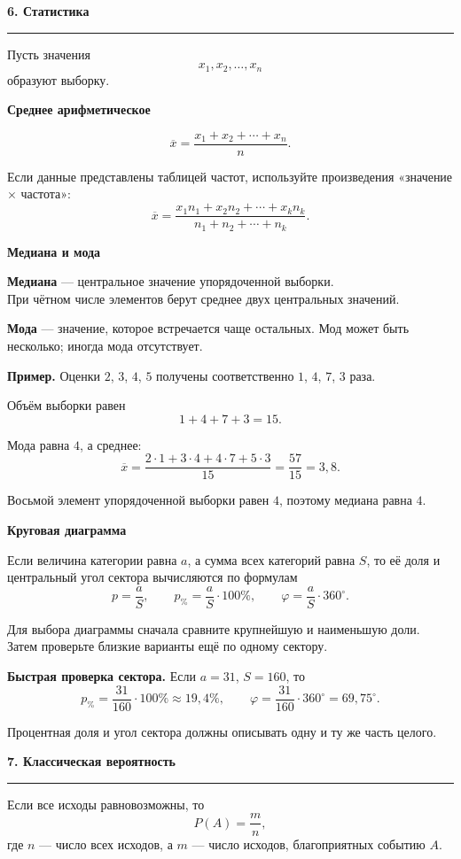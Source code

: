 \documentclass[a4paper,12pt]{article}
\newcommand{\Section}[1]{%
  \Needspace{5\baselineskip}%
  \vspace{0.6em}%
  {\Large\bfseries\color{darkaccent}#1}\par
  \vspace{0.2em}%
  {\color{accent}\rule{0.14\linewidth}{1.2pt}}\par
  \vspace{0.4em}%
}
\newcommand{\Subsection}[1]{%
  \Needspace{3\baselineskip}%
  \vspace{0.45em}%
  {\large\bfseries\color{darkaccent}#1}\par
  \vspace{0.15em}%
}
\newcommand{\Key}[1]{\textbf{\color{darkaccent}#1}}
\newcommand{\degree}{^{\circ}}
\begin{document}
\clearpage

\Section{6. Статистика}

Пусть значения
\[
  x_1,x_2,\ldots,x_n
\]
образуют выборку.

\Subsection{Среднее арифметическое}

\[
  \overline{x}
  =
  \frac{x_1+x_2+\cdots+x_n}{n}.
\]

Если данные представлены таблицей частот, используйте произведения
«значение $\times$ частота»:
\[
  \overline{x}
  =
  \frac{x_1n_1+x_2n_2+\cdots+x_kn_k}
       {n_1+n_2+\cdots+n_k}.
\]

\Subsection{Медиана и мода}

\Key{Медиана} — центральное значение упорядоченной выборки.\\
При чётном числе элементов берут среднее двух центральных значений.

\Key{Мода} — значение, которое встречается чаще остальных.
Мод может быть несколько; иногда мода отсутствует.

\Key{Пример.}
Оценки $2$, $3$, $4$, $5$ получены соответственно
$1$, $4$, $7$, $3$ раза.

Объём выборки равен
\[
  1+4+7+3=15.
\]

Мода равна $4$, а среднее:
\[
  \overline{x}
  =
  \frac{2\cdot1+3\cdot4+4\cdot7+5\cdot3}{15}
  =
  \frac{57}{15}
  =
  3{,}8.
\]

Восьмой элемент упорядоченной выборки равен $4$, поэтому медиана равна $4$.

\Subsection{Круговая диаграмма}

Если величина категории равна $a$, а сумма всех категорий равна $S$, то её
доля и центральный угол сектора вычисляются по формулам
\[
  p=\frac{a}{S},
  \qquad
  p_{\%}=\frac{a}{S}\cdot100\%,
  \qquad
  \varphi=\frac{a}{S}\cdot360\degree.
\]

Для выбора диаграммы сначала сравните крупнейшую и наименьшую доли.
Затем проверьте близкие варианты ещё по одному сектору.

\Key{Быстрая проверка сектора.}
Если $a=31$, $S=160$, то
\[
  p_{\%}
  =
  \frac{31}{160}\cdot100\%
  \approx19{,}4\%,
  \qquad
  \varphi
  =
  \frac{31}{160}\cdot360\degree
  =
  69{,}75\degree.
\]

Процентная доля и угол сектора должны описывать одну и ту же часть целого.

\clearpage

\Section{7. Классическая вероятность}

Если все исходы равновозможны, то
\[
  P(A)=\frac{m}{n},
\]
где $n$ — число всех исходов, а $m$ — число исходов,
благоприятных событию $A$.
\end{document}
